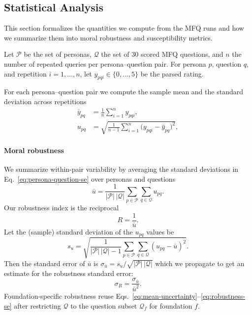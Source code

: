 \documentclass{article}
\begin{document}
\subsection{Statistical Analysis}



This section formalizes the quantities we compute from the MFQ runs and how we summarize them into moral robustness and susceptibility metrics.

Let \(\mathcal{P}\) be the set of personas, \(\mathcal{Q}\) the set of 30 scored MFQ questions, and \(n\) the number of repeated queries per persona--question pair. For persona \(p\), question \(q\), and repetition \(i=1,\ldots,n\), let \(y_{pqi}\in\{0,\ldots,5\}\) be the parsed rating.

For each persona--question pair we compute the sample mean and the standard deviation across repetitions
\begin{align}
  \bar{y}_{pq} &= \frac{1}{n} \sum_{i=1}^{n} y_{pqi}, \label{eq:persona-question-mean}\\
  u_{pq} &= \sqrt{\frac{1}{n-1} \sum_{i=1}^{n} \big(y_{pqi} - \bar{y}_{pq}\big)^2}, \label{eq:persona-question-se}
\end{align}

\paragraph{Moral robustness} We summarize within-pair variability by averaging the standard deviations in Eq.~\eqref{eq:persona-question-se} over personas and questions
\begin{equation}
  \bar{u} = \frac{1}{|\mathcal{P}|\,|\mathcal{Q}|} \sum_{p \in \mathcal{P}} \sum_{q \in \mathcal{Q}} u_{pq}.\label{eq:mean-uncertainty}
\end{equation}
Our robustness index is the reciprocal
\begin{equation}
  R = \frac{1}{\bar{u}}.\label{eq:robustness}
\end{equation}
Let the (sample) standard deviation of the \(u_{pq}\) values be
\begin{equation}
  s_u = \sqrt{\frac{1}{|\mathcal{P}|\,|\mathcal{Q}| - 1} \sum_{p \in \mathcal{P}} \sum_{q \in \mathcal{Q}} (u_{pq} - \bar{u})^2}.\label{eq:uncertainty-sd}
\end{equation}
Then the standard error of \(\bar{u}\) is \(\sigma_{\bar{u}} = s_u / \sqrt{|\mathcal{P}|\,|\mathcal{Q}|}\) which we propagate to get an estimate for the robustness standard error:
\begin{equation}
  \sigma_R = \frac{\sigma_{\bar{u}}}{\bar{u}^2}.
  \label{eq:robustness-se}
\end{equation}
Foundation-specific robustness reuse Eqs.~\eqref{eq:mean-uncertainty}--\eqref{eq:robustness-se} after restricting \(\mathcal{Q}\) to the question subset \(\mathcal{Q}_f\) for foundation \(f\).
\end{document}
